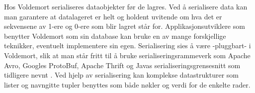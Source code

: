 Hos Voldemort serialiseres dataobjekter før de lagres. Ved å serialisere data kan man garantere at datalageret er helt og holdent uvitende om hva det er sekvensene av 1-ere og 0-ere som blir lagret står for. Applikasjonsutviklere som benytter Voldemort som sin database kan bruke en av mange forskjellige teknikker, eventuelt implementere sin egen. Serialisering sies å være -pluggbart- i Voldemort, slik at man står fritt til å bruke serialiseringsrammeverk som Apache Avro, Googles ProtoBuf, Apache Thrift og Javas serialiseringsgrensesnitt som tidligere nevnt \citep{Kreps2009}. Ved hjelp av serialisering kan komplekse datastrukturer som lister og navngitte tupler benyttes som både nøkler og verdi for de enkelte rader.

